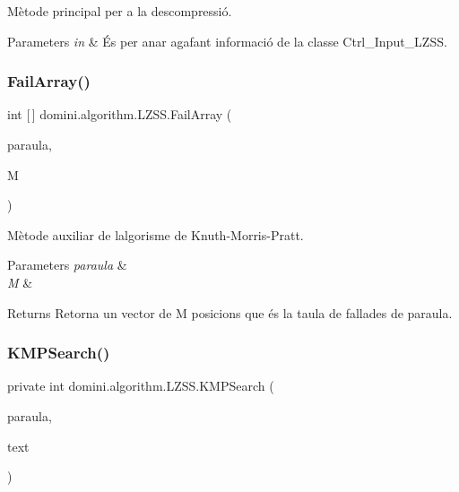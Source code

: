 Mètode principal per a la descompressió. 


\begin{DoxyParams}{Parameters}
{\em in} & És per anar agafant informació de la classe Ctrl\+\_\+\+Input\+\_\+\+L\+Z\+SS. \\
\hline
\end{DoxyParams}
\mbox{\label{classdomini_1_1algorithm_1_1LZSS_a56733a42f84d7a58cc5db9ea5f67835f}} 
\subsubsection{\texorpdfstring{Fail\+Array()}{FailArray()}}
{\footnotesize\ttfamily int \mbox{[}$\,$\mbox{]} domini.\+algorithm.\+L\+Z\+S\+S.\+Fail\+Array (\begin{DoxyParamCaption}\item[{Array\+List$<$ Byte $>$}]{paraula,  }\item[{int}]{M }\end{DoxyParamCaption})\hspace{0.3cm}{\ttfamily [inline]}}



Mètode auxiliar de l\textquotesingle{}algorisme de Knuth-\/\+Morris-\/\+Pratt. 


\begin{DoxyParams}{Parameters}
{\em paraula} & \\
\hline
{\em M} & \\
\hline
\end{DoxyParams}
\begin{DoxyReturn}{Returns}
Retorna un vector de M posicions que és la taula de fallades de paraula. 
\end{DoxyReturn}
\mbox{\label{classdomini_1_1algorithm_1_1LZSS_a88e88f2bb6e984cadf48e1c71f0234fc}} 
\subsubsection{\texorpdfstring{K\+M\+P\+Search()}{KMPSearch()}}
{\footnotesize\ttfamily private int domini.\+algorithm.\+L\+Z\+S\+S.\+K\+M\+P\+Search (\begin{DoxyParamCaption}\item[{Array\+List$<$ Byte $>$}]{paraula,  }\item[{\hyperlink{classdomini_1_1utils_1_1ArrayCircular}{Array\+Circular}}]{text }\end{DoxyParamCaption})\hspace{0.3cm}{\ttfamily [inline]}}



